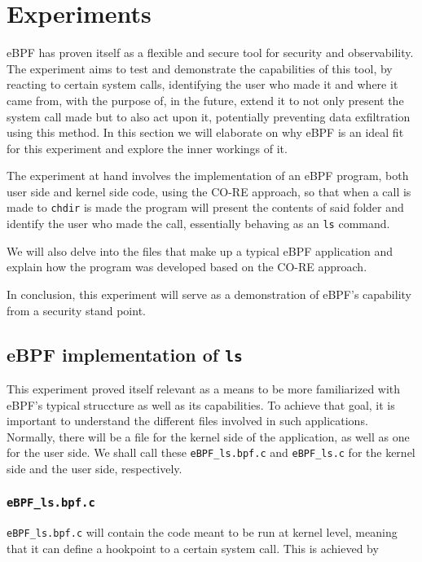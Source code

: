 \section{Experiments}

eBPF has proven itself as a flexible and secure tool for security and observability. The experiment aims to test and demonstrate the capabilities of this tool, by reacting to certain system calls, identifying the user who made it and where it came from, with the purpose of, in the future, extend it to not only present the system call made but to also act upon it, potentially preventing data exfiltration using this method. In this section we will elaborate on why eBPF is an ideal fit for this experiment and explore the inner workings of it.

The experiment at hand involves the implementation of an eBPF program, both user side and kernel side code, using the CO-RE approach, so that when a call is made to \texttt{chdir} is made the program will present the contents of said folder and identify the user who made the call, essentially behaving as an \texttt{ls} command. 

We will also delve into the files that make up a typical eBPF application and explain how the program was developed based on the CO-RE approach. 

In conclusion, this experiment will serve as a demonstration of eBPF's capability from a security stand point. 

\subsection{\textbf{eBPF implementation of \texttt{ls}}}

This experiment proved itself relevant as a means to be more familiarized with eBPF's typical struccture as well as its capabilities. 
To achieve that goal, it is important to understand the different files involved in such applications. Normally, there will be a file for the kernel side of the application, as well as one for the user side. We shall call these \texttt{eBPF\_ls.bpf.c} and \texttt{eBPF\_ls.c} for the kernel side and the user side, respectively. 

\subsubsection{\texttt{eBPF\_ls.bpf.c}}
\texttt{eBPF\_ls.bpf.c} will contain the code meant to be run at kernel level, meaning that it can define a hookpoint to a certain system call. This is achieved by 


